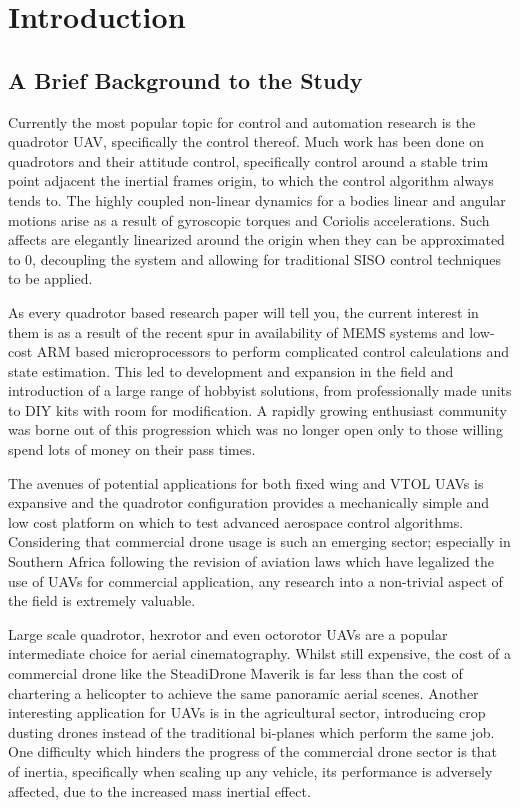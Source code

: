 \chapter{Introduction}
\label{ch:ch1}
\section{A Brief Background to the Study}
\label{sec:ch1.study}
Currently the most popular topic for control and automation research is the quadrotor UAV, specifically the control thereof. Much work has been done on quadrotors and their attitude control, specifically control around a stable trim point adjacent the inertial frames origin, to which the control algorithm always tends to. The highly coupled non-linear dynamics for a bodies linear and angular motions arise as a result of gyroscopic torques and Coriolis accelerations. Such affects are elegantly linearized around the origin when they can be approximated to 0, decoupling the system and allowing for traditional SISO control techniques to be applied.
\par
As every quadrotor based research paper will tell you, the current interest in them is as a result of the recent spur in availability of MEMS systems and low-cost ARM based microprocessors to perform complicated control calculations and state estimation. This led to development and expansion in the field and introduction of a large range of hobbyist solutions, from professionally made units to DIY kits with room for modification. A rapidly growing enthusiast community was borne out of this progression which was no longer open only to those willing spend lots of money on their pass times.
\par
The avenues of potential applications for both fixed wing and VTOL UAVs is expansive and the quadrotor configuration provides a mechanically simple and low cost platform on which to test advanced aerospace control algorithms. Considering that commercial drone usage is such an emerging sector; especially in Southern Africa following the revision of aviation laws which have legalized the use of UAVs for commercial application, any research into a non-trivial aspect of the field is extremely valuable. 
\par
Large scale quadrotor, hexrotor and even octorotor UAVs are a popular intermediate choice for aerial cinematography.  Whilst still expensive, the cost of a commercial drone like the SteadiDrone Maverik \cite{steadidrone} is far less than the cost of chartering a helicopter to achieve the same panoramic aerial scenes. Another interesting application for UAVs is in the agricultural sector, introducing crop dusting drones instead of the traditional bi-planes which perform the same job. One difficulty which hinders the progress of the commercial drone sector is that of inertia, specifically when scaling up any vehicle, its performance is adversely affected, due to the increased mass inertial effect.
